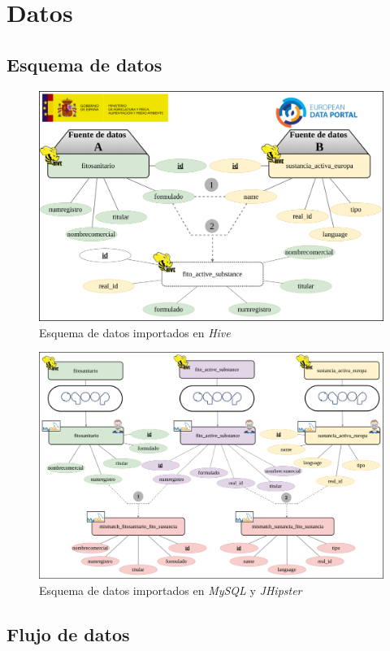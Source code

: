 \chapter{Datos} \label{a.datos}

\section{Esquema de datos} \label{a.datos.modelo}

\begin{figure}[H]
    \centering
    \includegraphics[width=\textwidth,height=\textheight,keepaspectratio]{Imagenes/esquemadedatos}
    \caption{Esquema de datos importados en \textit{Hive}}
    \label{fig:esquemadatoshive}
\end{figure}



\begin{landscape}

\begin{figure}[p!]
    
    \includegraphics[width=\linewidth]{Imagenes/esquemadedatosmysql}
    \caption{Esquema de datos importados en \textit{MySQL} y \textit{JHipster}}
    \label{fig:esquemadatosmysql}
\end{figure}

\end{landscape}

\section{Flujo de datos} \label{a.datos.flujo}



\par